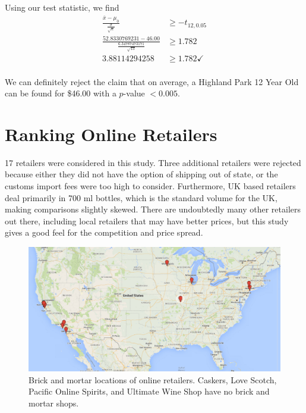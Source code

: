Using our test statistic, we find
\begin{equation*}
\begin{split}
    \frac{\overline{x} - \mu_0}{\frac{\sigma}{\sqrt{n}}} &\geq -t_{12, 0.05}\\
    \frac{52.8330769231 - 46.00}{\frac{6.34787473171}{\sqrt{13}}} &\geq 1.782\\
    3.88114294258 &\geq 1.782 \checkmark\\
\end{split}
\end{equation*}

We can definitely reject the claim that on average, a Highland Park 12 Year Old can be found for \$46.00 with a $p$-value $< 0.005$. 

\pagebreak

\section{Ranking Online Retailers}

17 retailers were considered in this study. Three additional retailers were rejected because either they did not have the option of shipping out of state, or the customs import fees were too high to consider. Furthermore, UK based retailers deal primarily in 700 ml bottles, which is the standard volume for the UK, making comparisons slightly skewed. There are undoubtedly many other retailers out there, including local retailers that may have better prices, but this study gives a good feel for the competition and price spread.

\begin{figure}[htb]
\centering
\includegraphics[scale=.3]{retailer_locations} 
\caption{Brick and mortar locations of online retailers. Caskers, Love Scotch, Pacific Online Spirits, and Ultimate Wine Shop have no brick and mortar shops.}
\label{fig:retailer_locations} 
\end{figure}

